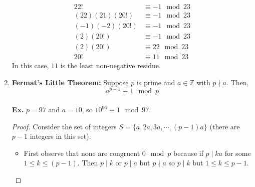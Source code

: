 \documentclass[class=article, crop=false]{standalone}
\def\integers{{\mathbb Z}}
\begin{document}
\begin{enumerate}[1.]
	\begin{align*}
		22! &\equiv -1\mod 23 \\
		(22)(21)(20!) &\equiv -1\mod 23 \\
		(-1)(-2)(20!) &\equiv -1\mod 23 \\
		(2)(20!) &\equiv -1\mod 23 \\
		(2)(20!) &\equiv 22\mod 23 \\
		20! &\equiv 11\mod 23
	\end{align*}
	In this case, $11$ is the least non-negative residue.
	\item \textbf{Fermat's Little Theorem:}
	Suppose $p$ is prime and $a\in\integers$ with $p\nmid a$. Then,
	$$a^{p-1} \equiv 1\mod p$$\\
	\textbf{Ex.} $p=97$ and $a=10$, so $10^{96}\equiv 1\mod 97$.
	\begin{proof}
		Consider the set of integers $S=\{a,2a,3a,\cdots,(p-1)a\}$ (there are $p-1$ integers in this set).
		\begin{itemize}
		\item First observe that none are congruent $0\mod p$ because if $p\mid ka$ for some $1\leq k\leq (p-1)$.
		Then $p\mid k$ or $p\mid a$ but $p\nmid a$ so $p\mid k$ but $1\leq k\leq p-1$.
		

\end{itemize}
\end{proof}
\end{enumerate}
\end{document}
